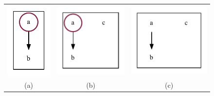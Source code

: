 \documentclass[a4paper, 12pt]{article}
\begin{document}
	\begin{figure}[h!]
		\centering
		\begin{tabular}{ccc}
			\includegraphics[scale=0.6666]{../graphics/initial-complete.pdf} &
			\includegraphics[scale=0.6666]{../graphics/initial-incomplete.pdf} &
			\includegraphics[scale=0.6666]{../graphics/no-initial-incomplete.pdf}\\
			(a) & (b) & (c)

\end{tabular}
\end{figure}
\end{document}
